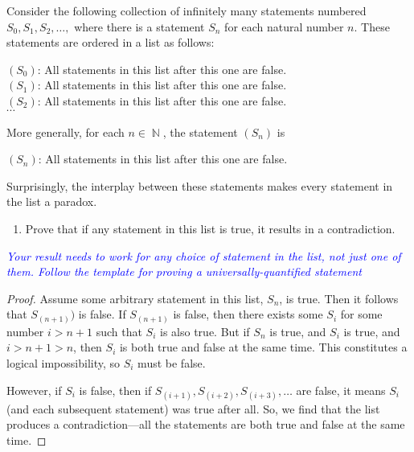 \documentclass{article}
\renewcommand{\(}{\left(}
\renewcommand{\)}{\right)}
\DeclareMathOperator{\N}{\mathbb{N}}
\theoremstyle{plain}
\theoremstyle{plain}
\theoremstyle{definition}
\begin{document}
Consider the following collection of infinitely many statements numbered
$S_0, S_1, S_2,\dots,$ where there is a statement $S_n$ for each
natural number $n$.
These statements are ordered in a list as follows:

\begin{mdframed}[backgroundcolor=yellow!20] 
\begin{center}
$(S_0)$: All statements in this list after this one are false. \\
$(S_1)$: All statements in this list after this one are false. \\
$(S_2)$: All statements in this list after this one are false. \\
$\cdots$
\end{center}
\end{mdframed}

More generally, for each $n \in \N$, the statement $(S_n)$ is
\begin{center}
$(S_n)$: All statements in this list after this one are false.
\end{center}
Surprisingly,
the interplay between these statements makes every statement in the list
a paradox.

\begin{enumerate}[label*=\roman*.,ref=\roman*]

\item Prove that if any statement in this list is true, it results in a contradiction.

\end{enumerate}

\textit{\textcolor{blue}{Your result needs to work for any choice of statement in the list, not just one of them. Follow the template for proving a universally-quantified statement}}

\begin{shaded}
\begin{proof}
	Assume some arbitrary statement in this list, $S_n$, is true. Then it follows that $S_{(n+1)})$ is false. If $S_{(n+1)}$ is false, then there exists some $S_i$ for some number $i > n + 1$ such that $S_i$ is also true. But if $S_n$ is true, and $S_i$ is true, and $i > n + 1 > n$, then $S_i$ is both true and false at the same time. This constitutes a logical impossibility, so $S_i$ must be false.
	
	However, if $S_i$ is false, then if $S_{(i+1)}, S_{(i+2)}, S_{(i+3)}, \ldots$ are false, it means $S_i$ (and each subsequent statement) was true after all. So, we find that the list produces a contradiction---all the statements are both true and false at the same time.
\end{proof}
\end{shaded}
\end{document}

